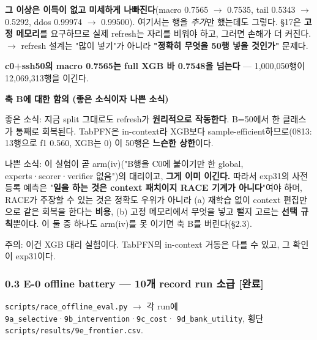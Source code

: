 \par\noindent \textbullet\enspace \textbf{그 이상은 이득이 없고 미세하게 나빠진다}(macro 0.7565  \ensuremath{\rightarrow}  0.7535, tail 0.5343  \ensuremath{\rightarrow}  0.5292, ddos 0.99974  \ensuremath{\rightarrow}  0.99500). 여기서는 행을 \emph{추가}만 했는데도 그렇다. §17은 \textbf{고정 메모리}를 요구하므로 실제 refresh는 자리를 비워야 하고, 그러면 손해가 더 커진다.  \ensuremath{\rightarrow}  refresh 설계는 "많이 넣기"가 아니라 \textbf{"정확히 무엇을 50행 넣을 것인가"} 문제다.


\par\noindent \textbullet\enspace \textbf{c0+\allowbreak{}ssh50의 macro 0.7565는 full XGB 바 0.7548을 넘는다} — 1,000,050행이 12,069,313행을 이긴다.


\textbf{축 B에 대한 함의 (좋은 소식이자 나쁜 소식)}

\par\noindent \textbullet\enspace 좋은 소식: 지금 split 그대로도 refresh가 \textbf{원리적으로 작동한다}. B=\allowbreak{}50에서 한 클래스가 통째로 회복된다. TabPFN은 in-context라 XGB보다 sample-efficient하므로(0813: 13행으로 f1 0.560, XGB는 0) 이 50행은 \textbf{느슨한 상한}이다.


\par\noindent \textbullet\enspace 나쁜 소식: 이 실험이 곧 arm(iv)("B행을 C0에 붙이기만 한 global, experts·scorer·verifier 없음")의 대리이고, \textbf{그게 이미 이긴다.} 따라서 exp31의 사전 등록 예측은 "\textbf{일을 하는 것은 context 패치이지 RACE 기계가 아니다}"여야 하며, RACE가 주장할 수 있는 것은 정확도 우위가 아니라 (a) 재학습 없이 context 편집만으로 같은 회복을 한다는 \textbf{비용}, (b) 고정 메모리에서 무엇을 넣고 뺄지 고르는 \textbf{선택 규칙}뿐이다. 이 둘 중 하나도 arm(iv)를 못 이기면 축 B를 버린다(§2.3).


\par\noindent \textbullet\enspace 주의: 이건 XGB 대리 실험이다. TabPFN의 in-context 거동은 다를 수 있고, 그 확인이 exp31이다.


\subsubsection{0.3 E-0 offline battery — 10개 record run 소급 [완료]}
\texttt{scripts/\allowbreak{}\allowbreak{}race\_\allowbreak{}\allowbreak{}off\allowbreak{}line\_\allowbreak{}\allowbreak{}eva\allowbreak{}l.\allowbreak{}py}  \ensuremath{\rightarrow}  각 run에 \texttt{9a\_\allowbreak{}\allowbreak{}selec\allowbreak{}tive}·\texttt{9b\_\allowbreak{}\allowbreak{}inter\allowbreak{}vention}·\texttt{9c\_\allowbreak{}\allowbreak{}cost}· \texttt{9d\_\allowbreak{}\allowbreak{}bank\_\allowbreak{}\allowbreak{}utility}, 횡단 \texttt{scripts/\allowbreak{}\allowbreak{}results/\allowbreak{}\allowbreak{}9e\_\allowbreak{}\allowbreak{}front\allowbreak{}ier.\allowbreak{}csv}.

